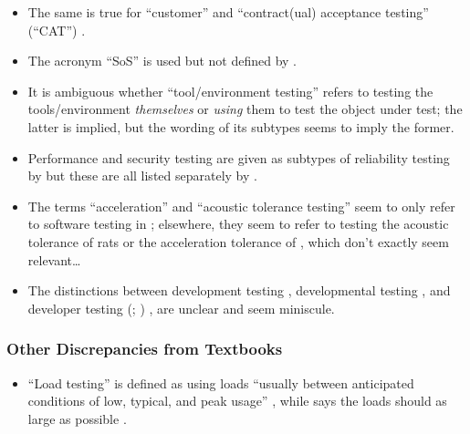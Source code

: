 \begin{itemize}
            acronym: ``HIL''\footnote{``HiL'' is used for the former by
                  \citet[p.~2]{PreußeEtAl2012}.} \citep[p.~23]{Firesmith2015}.
      \item The same is true for ``customer'' and ``contract(ual) acceptance
            testing'' (``CAT'') \citep[p.~30]{Firesmith2015}.
      \item The acronym ``SoS'' is used but not defined by
            \citet[p.~23]{Firesmith2015}.
      \item It is ambiguous whether ``tool/environment testing'' refers to
            testing the tools/environment \emph{themselves} or \emph{using}
            them to test the object under test; the latter is implied, but the
            wording of its subtypes \citep[p.~25]{Firesmith2015} seems to imply
            the former.
            \fi
      \item Performance and security testing are given as subtypes of
            reliability testing by \citep{ISO_IEC2023a} but
            these are all listed separately by \citet[p.~53]{Firesmith2015}.
            \ifnotpaper
      \item The terms ``acceleration'' and ``acoustic tolerance testing'' seem
            to only refer to software testing in \citep[p.~56]{Firesmith2015};
            elsewhere, they seem to refer to testing the acoustic tolerance of
            rats \citep{HolleyEtAl1996} or the acceleration tolerance of
            \accelTolTest{}, which don't exactly seem relevant\dots
            \fi
      \item The distinctions between development testing \citep[p.~136]{IEEE2017},
            developmental testing \citep[p.~30]{Firesmith2015}, and developer
            testing
            \ifnotpaper
                  (\citealp[p.~39]{Firesmith2015}; \citealp[p.~11]{Gerrard2000a})
            \else
                  \cite[p.~39]{Firesmith2015}, \cite[p.~11]{Gerrard2000a}
            \fi are unclear and seem miniscule.
\end{itemize}

\ifnotpaper
      \subsubsection{Other Discrepancies from Textbooks}

      \begin{itemize}
            \item ``Load testing'' is defined as using loads ``usually between
                  anticipated conditions of low, typical, and peak usage''
                  \citep[p.~5]{IEEE2022}, while \citeauthor{Patton2006} says the
                  loads should as large as possible \citeyearpar[p.~86]{Patton2006}.
      \end{itemize}
\fi

